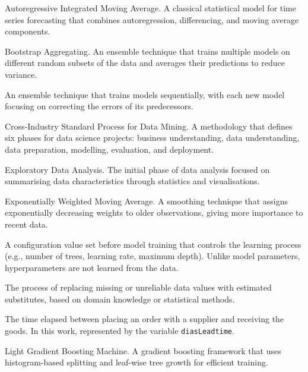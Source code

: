 \documentclass[ENG]{TFUOC}%
\begin{document}
\begin{description}[style=nextline, leftmargin=3.5cm, labelwidth=3.2cm]

\item[ARIMA] Autoregressive Integrated Moving Average. A classical statistical model for time series forecasting that combines autoregression, differencing, and moving average components.

\item[Bagging] Bootstrap Aggregating. An ensemble technique that trains multiple models on different random subsets of the data and averages their predictions to reduce variance.

\item[Boosting] An ensemble technique that trains models sequentially, with each new model focusing on correcting the errors of its predecessors.

\item[CRISP-DM] Cross-Industry Standard Process for Data Mining. A methodology that defines six phases for data science projects: business understanding, data understanding, data preparation, modelling, evaluation, and deployment.

\item[EDA] Exploratory Data Analysis. The initial phase of data analysis focused on summarising data characteristics through statistics and visualisations.

\item[EWMA] Exponentially Weighted Moving Average. A smoothing technique that assigns exponentially decreasing weights to older observations, giving more importance to recent data.

\item[Hyperparameter] A configuration value set before model training that controls the learning process (e.g., number of trees, learning rate, maximum depth). Unlike model parameters, hyperparameters are not learned from the data.

\item[Imputation] The process of replacing missing or unreliable data values with estimated substitutes, based on domain knowledge or statistical methods.

\item[Lead time] The time elapsed between placing an order with a supplier and receiving the goods. In this work, represented by the variable \texttt{diasLeadtime}.

\item[LightGBM] Light Gradient Boosting Machine. A gradient boosting framework that uses histogram-based splitting and leaf-wise tree growth for efficient training.


\end{description}
\end{document}
